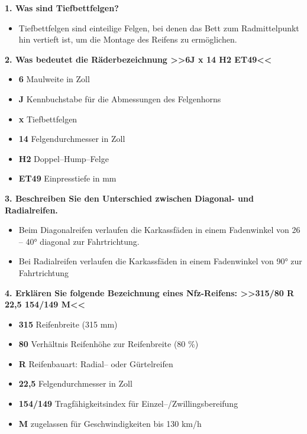 \textbf{1. Was sind Tiefbettfelgen?}

\begin{itemize}
\item
  Tiefbettfelgen sind einteilige Felgen, bei denen das Bett zum
  Radmittelpunkt hin vertieft ist, um die Montage des Reifens zu
  ermöglichen.
\end{itemize}

\textbf{2. Was bedeutet die Räderbezeichnung >>6J x 14 H2 ET49<<}

\begin{itemize}
\item
  \textbf{6} Maulweite in Zoll
\item
  \textbf{J} Kennbuchstabe für die Abmessungen des Felgenhorns
\item
  \textbf{x} Tiefbettfelgen
\item
  \textbf{14} Felgendurchmesser in Zoll
\item
  \textbf{H2} Doppel--Hump--Felge
\item
  \textbf{ET49} Einpresstiefe in mm
\end{itemize}

\textbf{3. Beschreiben Sie den Unterschied zwischen Diagonal- und
Radialreifen.}

\begin{itemize}
\item
  Beim Diagonalreifen verlaufen die Karkassfäden in einem Fadenwinkel
  von 26 -- 40° diagonal zur Fahrtrichtung.
\item
  Bei Radialreifen verlaufen die Karkassfäden in einem Fadenwinkel von
  90° zur Fahrtrichtung
\end{itemize}

\textbf{4. Erklären Sie folgende Bezeichnung eines Nfz-Reifens: >>315/80
R 22,5 154/149 M<<}

\begin{itemize}
\item
  \textbf{315} Reifenbreite (315 mm)
\item
  \textbf{80} Verhältnis Reifenhöhe zur Reifenbreite (80 \%)
\item
  \textbf{R} Reifenbauart: Radial-- oder Gürtelreifen
\item
  \textbf{22,5} Felgendurchmesser in Zoll
\item
  \textbf{154/149} Tragfähigkeitsindex für Einzel--/Zwillingsbereifung
\item
  \textbf{M} zugelassen für Geschwindigkeiten bis 130 km/h
\end{itemize}

